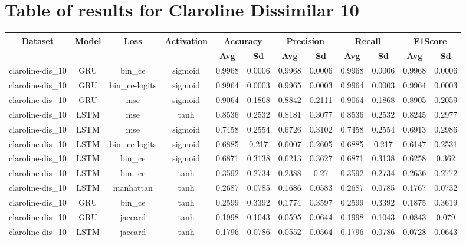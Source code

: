 \documentclass{article}%
\begin{document}
\section{Table of results for Claroline Dissimilar 10}%
\label{sec:TableofresultsforClarolineDissimilar10}%
\begin{tabular}{|c|c|c|c|c|c|c|c|c|c|c|c|}%
\hline%
\rowcolor{lightgray!70}%
\textbf{Dataset}&\textbf{Model}&\textbf{Loss}&\textbf{Activation}&\multicolumn{2}{c|}{\textbf{Accuracy}}&\multicolumn{2}{c|}{\textbf{Precision}}&\multicolumn{2}{c|}{\textbf{Recall}}&\multicolumn{2}{c|}{\textbf{F1Score}}\\%
\hline%
\rowcolor{lightgray!70}%
\textbf{}&\textbf{}&\textbf{}&\textbf{}&\textbf{Avg}&\textbf{Sd}&\textbf{Avg}&\textbf{Sd}&\textbf{Avg}&\textbf{Sd}&\textbf{Avg}&\textbf{Sd}\\%
\hline%
claroline{-}dis\_10&GRU&bin\_ce&sigmoid&0.9968&0.0006&0.9968&0.0006&0.9968&0.0006&0.9968&0.0006\\%
\hline%
claroline{-}dis\_10&GRU&bin\_ce{-}logits&sigmoid&0.9964&0.0003&0.9965&0.0003&0.9964&0.0003&0.9964&0.0003\\%
\hline%
claroline{-}dis\_10&GRU&mse&sigmoid&0.9064&0.1868&0.8842&0.2111&0.9064&0.1868&0.8905&0.2059\\%
\hline%
claroline{-}dis\_10&LSTM&mse&tanh&0.8536&0.2532&0.8181&0.3077&0.8536&0.2532&0.8245&0.2977\\%
\hline%
claroline{-}dis\_10&LSTM&mse&sigmoid&0.7458&0.2554&0.6726&0.3102&0.7458&0.2554&0.6913&0.2986\\%
\hline%
claroline{-}dis\_10&LSTM&bin\_ce{-}logits&sigmoid&0.6885&0.217&0.6007&0.2605&0.6885&0.217&0.6147&0.2531\\%
\hline%
claroline{-}dis\_10&LSTM&bin\_ce&sigmoid&0.6871&0.3138&0.6213&0.3627&0.6871&0.3138&0.6258&0.362\\%
\hline%
claroline{-}dis\_10&LSTM&bin\_ce&tanh&0.3592&0.2734&0.2388&0.27&0.3592&0.2734&0.2636&0.2772\\%
\hline%
claroline{-}dis\_10&LSTM&manhattan&tanh&0.2687&0.0785&0.1686&0.0583&0.2687&0.0785&0.1767&0.0732\\%
\hline%
claroline{-}dis\_10&GRU&bin\_ce&tanh&0.2599&0.3392&0.1774&0.3597&0.2599&0.3392&0.1875&0.3619\\%
\hline%
claroline{-}dis\_10&GRU&jaccard&tanh&0.1998&0.1043&0.0595&0.0644&0.1998&0.1043&0.0843&0.079\\%
\hline%
claroline{-}dis\_10&LSTM&jaccard&tanh&0.1796&0.0786&0.0552&0.0564&0.1796&0.0786&0.0728&0.0643\\%

\end{tabular}
\end{document}
